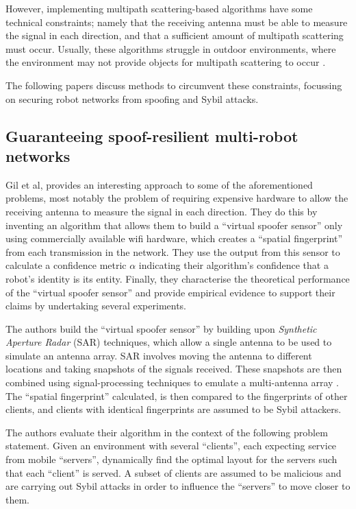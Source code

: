 However, implementing multipath scattering-based algorithms have some technical constraints; namely that the receiving antenna must be able to measure the signal in each direction, and that a sufficient amount of multipath scattering must occur. Usually, these algorithms struggle in outdoor environments, where the environment may not provide objects for multipath scattering to occur \citationneeded.

The following papers discuss methods to circumvent these constraints, focussing on securing robot networks from spoofing and Sybil attacks. 

\subsection{Guaranteeing spoof-resilient multi-robot networks}
Gil et al, \cite{GuaranteeingSpoofResilience} provides an interesting approach to some of the aforementioned problems, most notably the problem of requiring expensive hardware to allow the receiving antenna to measure the signal in each direction. They do this by inventing an algorithm that allows them to build a ``virtual spoofer sensor'' only using commercially available wifi hardware, which creates a ``spatial fingerprint'' from each transmission in the network. They use the output from this sensor to calculate a confidence metric $\alpha$ indicating their algorithm's confidence that a robot's identity is its entity. Finally, they characterise the theoretical performance of the ``virtual spoofer sensor'' and provide empirical evidence to support their claims by undertaking several experiments.

The authors build the ``virtual spoofer sensor'' by building upon \textit{Synthetic Aperture Radar} (SAR) techniques, which allow a single antenna to be used to simulate an antenna array. SAR involves moving the antenna to different locations and taking snapshots of the signals received. These snapshots are then combined using signal-processing techniques to emulate a multi-antenna array \cite{BAD_SAR}. 
The ``spatial fingerprint'' calculated, is then compared to the fingerprints of other clients, and clients with identical fingerprints are assumed to be Sybil attackers.

The authors evaluate their algorithm in the context of the following problem statement. Given an environment with several ``clients'', each expecting service from mobile ``servers'', dynamically find the optimal layout for the servers such that each ``client'' is served. A subset of clients are assumed to be malicious and are carrying out Sybil attacks in order to influence the ``servers'' to move closer to them.

